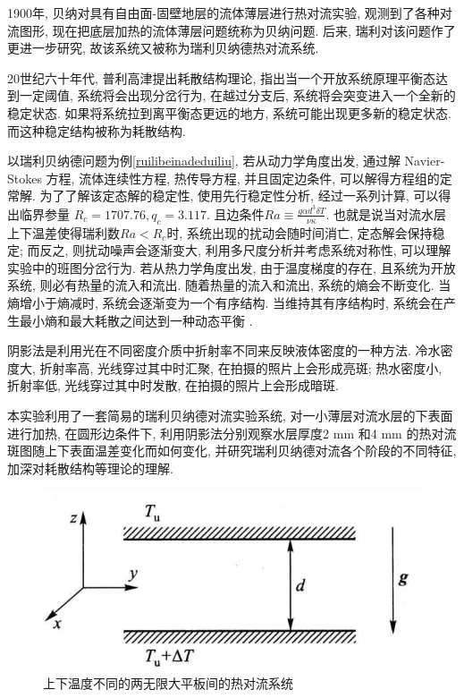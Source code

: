 \documentclass[font=default]{mpltx}
\begin{document}
  1900年, 贝纳对具有自由面-固壁地层的流体薄层进行热对流实验, 观测到了各种对流图形, 现在把底层加热的流体薄层问题统称为贝纳问题. 后来, 瑞利对该问题作了更进一步研究, 故该系统又被称为瑞利贝纳德热对流系统.
  \par
  20世纪六十年代, 普利高津提出耗散结构理论, 指出当一个开放系统原理平衡态达到一定阈值, 系统将会出现分岔行为, 在越过分支后, 系统将会突变进入一个全新的稳定状态. 
  如果将系统拉到离平衡态更远的地方, 系统可能出现更多新的稳定状态. 
  而这种稳定结构被称为耗散结构.
  \par
  以瑞利贝纳德问题为例\autoref{ruilibeinadeduiliu}, 若从动力学角度出发, 通过解 Navier-Stokes 方程, 流体连续性方程, 热传导方程, 并且固定边条件, 可以解得方程组的定常解. 为了了解该定态解的稳定性, 使用先行稳定性分析, 经过一系列计算,
  可以得出临界参量
  $R_c = 1707.76, q_c = 3.117$.
  且边条件$Ra\equiv\frac{g\alpha d^3\delta T}{\nu\kappa}$.
  也就是说当对流水层上下温差使得瑞利数$Ra < R_c$时, 系统出现的扰动会随时间消亡, 定态解会保持稳定; 而反之, 则扰动噪声会逐渐变大, 利用多尺度分析并考虑系统对称性, 可以理解实验中的班图分岔行为.
  若从热力学角度出发, 由于温度梯度的存在, 且系统为开放系统, 则必有热量的流入和流出. 随着热量的流入和流出, 系统的熵会不断变化. 当熵增小于熵减时, 系统会逐渐变为一个有序结构.
  当维持其有序结构时, 系统会在产生最小熵和最大耗散之间达到一种动态平衡 \cite{jindaiwulishiyan}.
  \par
  阴影法是利用光在不同密度介质中折射率不同来反映液体密度的一种方法. 冷水密度大, 折射率高, 光线穿过其中时汇聚, 在拍摄的照片上会形成亮斑; 热水密度小, 折射率低, 光线穿过其中时发散, 在拍摄的照片上会形成暗斑.
  \par
  本实验利用了一套简易的瑞利贝纳德对流实验系统, 对一小薄层对流水层的下表面进行加热, 在圆形边条件下, 利用阴影法分别观察水层厚度2 mm 和4 mm 的热对流斑图随上下表面温差变化而如何变化,
  并研究瑞利贝纳德对流各个阶段的不同特征, 加深对耗散结构等理论的理解.
  
  \begin{figure}[htbp]
    \centering
    \includegraphics[width=0.85\linewidth]{fig/ruilibeinadeduiliu.png}
    \caption{上下温度不同的两无限大平板间的热对流系统
      }

    \label{fig:ruilibeinadeduiliu}
  \end{figure}
\end{document}
